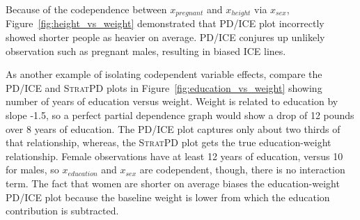 \documentclass[12pt]{article}
\newcommand{\figref}[1]{Figure~\ref{#1}}
\newcommand{\spd}{\fontfamily{cmr}\textsc{\small StratPD}}
\begin{document}
Because of the codependence between $x_{pregnant}$ and $x_{height}$ via $x_{sex}$, \figref{fig:height_vs_weight} demonstrated that PD/ICE plot incorrectly showed shorter people as heavier on average. PD/ICE conjures up unlikely observation such as pregnant males, resulting in biased ICE lines.

As another example of isolating codependent variable effects, compare the PD/ICE and \spd{} plots in \figref{fig:education_vs_weight} showing number of years of education versus weight. Weight is related to education by slope -1.5, so a perfect partial dependence graph would show a drop of 12 pounds over 8 years of education. The PD/ICE plot captures only about two thirds of that relationship, whereas, the \spd{} plot gets the true education-weight relationship.  Female observations have at least 12 years of education, versus 10 for males, so $x_{education}$ and $x_{sex}$ are codependent, though, there is no interaction term. The fact that women are shorter on average biases the education-weight PD/ICE plot because the baseline weight is lower from which the education contribution is  subtracted.
\end{document}
